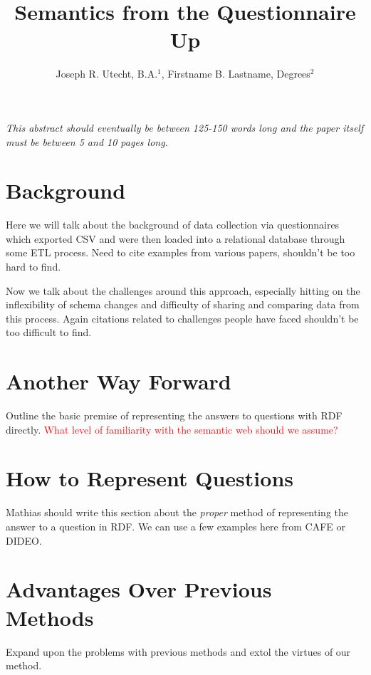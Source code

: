 \documentclass{amia}
\begin{document}
\title{Semantics from the Questionnaire Up}

\author{Joseph R. Utecht, B.A.$^{1}$, Firstname B. Lastname, Degrees$^{2}$}


\maketitle


\textit{This abstract should eventually be between 125-150 words long and the paper itself must be between 5 and 10 pages long.}

\section*{Background}
Here we will talk about the background of data collection via questionnaires which exported CSV and were then loaded into a relational database through some ETL process.  Need to cite examples from various papers, shouldn't be too hard to find.

Now we talk about the challenges around this approach, especially hitting on the inflexibility of schema changes and difficulty of sharing and comparing data from this process. Again citations related to challenges people have faced shouldn't be too difficult to find.

\section*{Another Way Forward}
Outline the basic premise of representing the answers to questions with RDF directly.
\textcolor{red}{What level of familiarity with the semantic web should we assume?}

\section*{How to Represent Questions}
Mathias should write this section about the \emph{proper} method of representing the answer to a question in RDF. We can use a few examples here from CAFE or DIDEO.

\section*{Advantages Over Previous Methods}
Expand upon the problems with previous methods and extol the virtues of our method.
\end{document}
